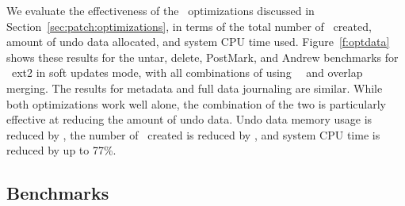 \opttable{}

We evaluate the effectiveness of the \patch\ optimizations discussed in
Section~\ref{sec:patch:optimizations}, in terms of
%
the total number of \patches\ created, amount of undo data allocated,
and system CPU time used.
%
Figure~\ref{f:optdata} shows these results for the untar, delete,
PostMark, and Andrew benchmarks for \Kudos\ ext2 in soft updates mode,
with all combinations of using \nrb\ \patches\ and overlap merging.
The results for metadata and full data journaling are similar.
%
While both optimizations work well alone, the combination of the two
is particularly effective at reducing the amount of undo data.
%
Undo data memory usage is reduced by \patchoptundo,
%
the number of \patches\ created is reduced by \patchoptcount,
%
and system CPU time is reduced by up to 77\%.

\begin{comment}
\begin{figure}[t]
\vspace{-0.5\baselineskip}
\centering{
\texttt{[image: rb\_patch\_size]}
}
\vspace{-0.5\baselineskip}
\caption{\label{fig:patchsize-histo} \Rb\ \patch\ size histogram for a sample
workload (extracting a large archive into ext2). All the \patches\ larger than
63 bytes have been optimized into \nrb\ \patches. \Rb\ \patches\ 4 bytes and
smaller account for about 51\% of all \rb\ \patches.}
\end{figure}
\end{comment}

\subsection {Benchmarks}
\label{sec:eval:bench}

\newcommand{\safe}[1]{\textbf{#1}}
\newcommand{\unsafe}[1]{#1}

